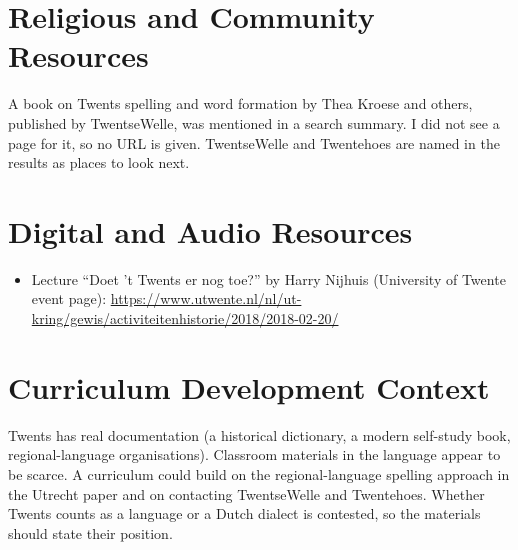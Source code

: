 \documentclass[12pt]{article}
\begin{document}
\section{Religious and Community Resources}
A book on Twents spelling and word formation by Thea Kroese and others, published by TwentseWelle, was mentioned in a search summary. I did not see a page for it, so no URL is given. TwentseWelle and Twentehoes are named in the results as places to look next.

\section{Digital and Audio Resources}
\begin{itemize}
\item Lecture ``Doet 't Twents er nog toe?'' by Harry Nijhuis (University of Twente event page): \url{https://www.utwente.nl/nl/ut-kring/gewis/activiteitenhistorie/2018/2018-02-20/}
\end{itemize}

\section{Curriculum Development Context}
Twents has real documentation (a historical dictionary, a modern self-study book, regional-language organisations). Classroom materials in the language appear to be scarce. A curriculum could build on the regional-language spelling approach in the Utrecht paper and on contacting TwentseWelle and Twentehoes. Whether Twents counts as a language or a Dutch dialect is contested, so the materials should state their position.
\end{document}
